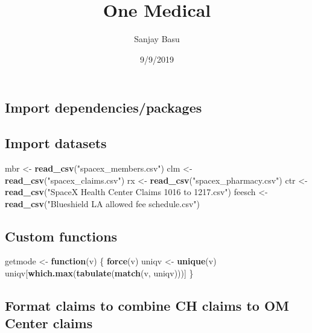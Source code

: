 \documentclass[]{article}
\title{One Medical}
\author{Sanjay Basu}
\date{9/9/2019}
\newenvironment{Shaded}{\begin{snugshade}}{\end{snugshade}}
\newcommand{\KeywordTok}[1]{\textcolor[rgb]{0.13,0.29,0.53}{\textbf{#1}}}
\newcommand{\StringTok}[1]{\textcolor[rgb]{0.31,0.60,0.02}{#1}}
\newcommand{\ControlFlowTok}[1]{\textcolor[rgb]{0.13,0.29,0.53}{\textbf{#1}}}
\newcommand{\NormalTok}[1]{#1}
\begin{document}
\maketitle

\subsection{Import
dependencies/packages}\label{import-dependenciespackages}

\subsection{Import datasets}\label{import-datasets}

\begin{Shaded}
\begin{Highlighting}[]
\NormalTok{mbr <-}\StringTok{ }\KeywordTok{read_csv}\NormalTok{(}\StringTok{"spacex_members.csv"}\NormalTok{)}
\NormalTok{clm <-}\StringTok{ }\KeywordTok{read_csv}\NormalTok{(}\StringTok{"spacex_claims.csv"}\NormalTok{)}
\NormalTok{rx <-}\StringTok{ }\KeywordTok{read_csv}\NormalTok{(}\StringTok{"spacex_pharmacy.csv"}\NormalTok{)}
\NormalTok{ctr <-}\StringTok{ }\KeywordTok{read_csv}\NormalTok{(}\StringTok{"SpaceX Health Center Claims 1016 to 1217.csv"}\NormalTok{)}
\NormalTok{feesch <-}\StringTok{ }\KeywordTok{read_csv}\NormalTok{(}\StringTok{"Blueshield LA allowed fee schedule.csv"}\NormalTok{)}
\end{Highlighting}
\end{Shaded}

\subsection{Custom functions}\label{custom-functions}

\begin{Shaded}
\begin{Highlighting}[]
\NormalTok{getmode <-}\StringTok{ }\ControlFlowTok{function}\NormalTok{(v) \{}
   \KeywordTok{force}\NormalTok{(v)}
\NormalTok{   uniqv <-}\StringTok{ }\KeywordTok{unique}\NormalTok{(v)}
\NormalTok{   uniqv[}\KeywordTok{which.max}\NormalTok{(}\KeywordTok{tabulate}\NormalTok{(}\KeywordTok{match}\NormalTok{(v, uniqv)))]}
\NormalTok{\}}
\end{Highlighting}
\end{Shaded}

\subsection{Format claims to combine CH claims to OM Center
claims}\label{format-claims-to-combine-ch-claims-to-om-center-claims}
\end{document}
